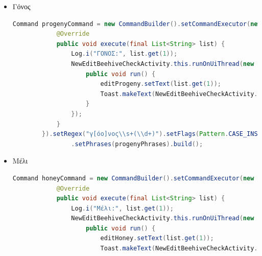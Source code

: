 \documentclass[oneside, 12pt]{book}
\begin{document}
\begin{itemize}
	\begin{lstlisting}[language=java]
	Command populationCommand = new CommandBuilder().setCommandExecutor(new CommandExecutor() {
            @Override
            public void execute(final List<String> list) {
                Log.i("Πληθυσμός:", list.get(1));
                NewEditBeehiveCheckActivity.this.runOnUiThread(new Runnable() {
                    public void run() {
                        editPopulation.setText(list.get(1));
                        Toast.makeText(NewEditBeehiveCheckActivity.this, "Πληθυσμός " + list.get(1) + "!", Toast.LENGTH_LONG).show();
                    }
                });
            }
        }).setRegex("πληθυσμ[οό]ς\\s+(\\d+)").setFlags(Pattern.CASE_INSENSITIVE | Pattern.DOTALL)
                .setPhrases(populationPhrases).build();
	\end{lstlisting}
	\item Γόνος
	\begin{lstlisting}[language=java]
	Command progenyCommand = new CommandBuilder().setCommandExecutor(new CommandExecutor() {
            @Override
            public void execute(final List<String> list) {
                Log.i("ΓΟΝΟΣ:", list.get(1));
                NewEditBeehiveCheckActivity.this.runOnUiThread(new Runnable() {
                    public void run() {
                        editProgeny.setText(list.get(1));
                        Toast.makeText(NewEditBeehiveCheckActivity.this, "ΓΟΝΟΣ " + list.get(1) + "!", Toast.LENGTH_LONG).show();
                    }
                });
            }
        }).setRegex("γ[όο]νος\\s+(\\d+)").setFlags(Pattern.CASE_INSENSITIVE | Pattern.DOTALL)
                .setPhrases(progenyPhrases).build();
	\end{lstlisting}
	\item Μέλι
	\begin{lstlisting}[language=java]
	Command honeyCommand = new CommandBuilder().setCommandExecutor(new CommandExecutor() {
            @Override
            public void execute(final List<String> list) {
                Log.i("Μέλι:", list.get(1));
                NewEditBeehiveCheckActivity.this.runOnUiThread(new Runnable() {
                    public void run() {
                        editHoney.setText(list.get(1));
                        Toast.makeText(NewEditBeehiveCheckActivity.this, "Μέλι " + list.get(1) + "!", Toast.LENGTH_LONG).show();

\end{lstlisting}
\end{itemize}
\end{document}
